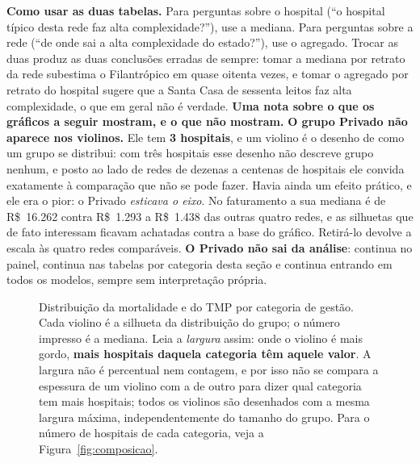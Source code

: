 \textbf{Como usar as duas tabelas.} Para perguntas sobre o hospital (``o
hospital típico desta rede faz alta complexidade?''), use a mediana. Para
perguntas sobre a rede (``de onde sai a alta complexidade do estado?''),
use o agregado. Trocar as duas produz as duas conclusões erradas de sempre:
tomar a mediana por retrato da rede subestima o Filantrópico em quase
oitenta vezes, e tomar o agregado por retrato do hospital sugere que a
Santa Casa de sessenta leitos faz alta complexidade, o que em geral não é
verdade.
\newpage
\textbf{Uma nota sobre o que os gráficos a seguir mostram, e o que não
mostram.} \textbf{O grupo Privado não aparece nos violinos.} Ele tem
\textbf{3 hospitais}, e um violino é o desenho de como um grupo se
distribui: com três hospitais esse desenho não descreve grupo nenhum, e
posto ao lado de redes de dezenas a centenas de hospitais ele convida
exatamente à comparação que não se pode fazer. Havia ainda um efeito
prático, e ele era o pior: o Privado \emph{esticava o eixo}. No
faturamento a sua mediana é de R\$~16.262 contra R\$~1.293 a R\$~1.438 das
outras quatro redes, e as silhuetas que de fato interessam ficavam
achatadas contra a base do gráfico. Retirá-lo devolve a escala às quatro
redes comparáveis. \textbf{O Privado não sai da análise}: continua no
painel, continua nas tabelas por categoria desta seção e continua entrando
em todos os modelos, sempre sem interpretação própria.


\begin{figure}[H]
\centering
{}
\caption{Distribuição da mortalidade e do TMP por categoria de gestão.
Cada violino é a silhueta da distribuição do grupo; o número impresso é
a mediana. Leia a \emph{largura} assim: onde o violino é mais gordo,
\textbf{mais hospitais daquela categoria têm aquele valor}. A largura
não é percentual nem contagem, e por isso não se compara a espessura de
um violino com a de outro para dizer qual categoria tem mais hospitais;
todos os violinos são desenhados com a mesma largura máxima,
independentemente do tamanho do grupo. Para o número de hospitais de
cada categoria, veja a Figura~\ref{fig:composicao}.}
\label{fig:violA}
\end{figure}

